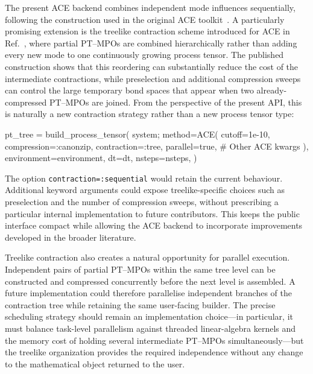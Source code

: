 The present ACE backend combines independent mode influences sequentially, following the construction used in the original ACE toolkit~\cite{CygorekGauger2024}.
A particularly promising extension is the treelike contraction scheme introduced for ACE in Ref.~\cite{Cygorek2024Treelike}, where partial PT--MPOs are combined hierarchically rather than adding every new mode to one continuously growing process tensor.
The published construction shows that this reordering can substantially reduce the cost of the intermediate contractions, while preselection and additional compression sweeps can control the large temporary bond spaces that appear when two already-compressed PT--MPOs are joined.
From the perspective of the present API, this is naturally a new contraction strategy rather than a new process tensor type:
%
\begin{juliacode}[
    caption={Prospective tree-like ACE construction through the existing builder interface.},
    label={lst:roadmap-tree-ace},
]
pt_tree = build_process_tensor(
    system;
    method=ACE(
        cutoff=1e-10,
        compression=:canonzip,
        contraction=:tree,
        parallel=true,
        # Other ACE kwargs
    ),
    environment=environment,
    dt=dt,
    nsteps=nsteps,
)
\end{juliacode}
%
The option \texttt{contraction=:sequential} would retain the current behaviour.
Additional keyword arguments could expose treelike-specific choices such as preselection and the number of compression sweeps, without prescribing a particular internal implementation to future contributors.
This keeps the public interface compact while allowing the ACE backend to incorporate improvements developed in the broader literature.

Treelike contraction also creates a natural opportunity for parallel execution.
Independent pairs of partial PT--MPOs within the same tree level can be constructed and compressed concurrently before the next level is assembled.
A future implementation could therefore parallelise independent branches of the contraction tree while retaining the same user-facing builder.
The precise scheduling strategy should remain an implementation choice---in particular, it must balance task-level parallelism against threaded linear-algebra kernels and the memory cost of holding several intermediate PT--MPOs simultaneously---but the treelike organization provides the required independence without any change to the mathematical object returned to the user.

